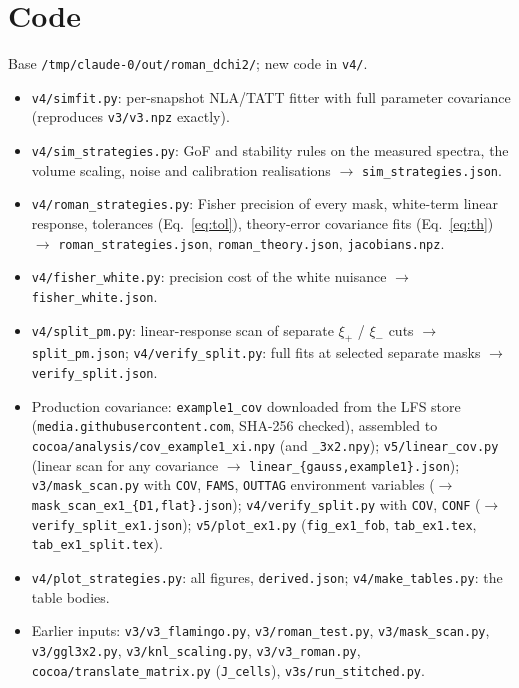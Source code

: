 \documentclass[11pt]{article}
\begin{document}
\section{Code}
Base \texttt{/tmp/claude-0/out/roman\_dchi2/}; new code in \texttt{v4/}.
\begin{itemize}\sloppy
\item \texttt{v4/simfit.py}: per-snapshot NLA/TATT fitter with full
  parameter covariance (reproduces \texttt{v3/v3.npz} exactly).
\item \texttt{v4/sim\_strategies.py}: GoF and stability rules on the measured
  spectra, the volume scaling, noise and calibration realisations
  $\rightarrow$ \texttt{sim\_strategies.json}.
\item \texttt{v4/roman\_strategies.py}: Fisher precision of every mask,
  white-term linear response, tolerances (Eq.~\ref{eq:tol}), theory-error
  covariance fits (Eq.~\ref{eq:th}) $\rightarrow$
  \texttt{roman\_strategies.json}, \texttt{roman\_theory.json},
  \texttt{jacobians.npz}.
\item \texttt{v4/fisher\_white.py}: precision cost of the white nuisance
  $\rightarrow$ \texttt{fisher\_white.json}.
\item \texttt{v4/split\_pm.py}: linear-response scan of separate $\xi_+$ /
  $\xi_-$ cuts $\rightarrow$ \texttt{split\_pm.json};
  \texttt{v4/verify\_split.py}: full fits at selected separate masks
  $\rightarrow$ \texttt{verify\_split.json}.
\item Production covariance: \texttt{example1\_cov} downloaded from the LFS
  store (\texttt{media.githubusercontent.com}, SHA-256 checked), assembled to
  \texttt{cocoa/analysis/cov\_example1\_xi.npy} (and \texttt{\_3x2.npy});
  \texttt{v5/linear\_cov.py} (linear scan for any covariance $\rightarrow$
  \texttt{linear\_\{gauss,example1\}.json}); \texttt{v3/mask\_scan.py} with
  \texttt{COV}, \texttt{FAMS}, \texttt{OUTTAG} environment variables
  ($\rightarrow$ \texttt{mask\_scan\_ex1\_\{D1,flat\}.json});
  \texttt{v4/verify\_split.py} with \texttt{COV}, \texttt{CONF}
  ($\rightarrow$ \texttt{verify\_split\_ex1.json}); \texttt{v5/plot\_ex1.py}
  (\texttt{fig\_ex1\_fob}, \texttt{tab\_ex1.tex}, \texttt{tab\_ex1\_split.tex}).
\item \texttt{v4/plot\_strategies.py}: all figures, \texttt{derived.json};
  \texttt{v4/make\_tables.py}: the table bodies.
\item Earlier inputs: \texttt{v3/v3\_flamingo.py}, \texttt{v3/roman\_test.py},
  \texttt{v3/mask\_scan.py}, \texttt{v3/ggl3x2.py},
  \texttt{v3/knl\_scaling.py}, \texttt{v3/v3\_roman.py},
  \texttt{cocoa/translate\_matrix.py} (\texttt{J\_cells}),
  \texttt{v3s/run\_stitched.py}.
\end{itemize}
\end{document}
